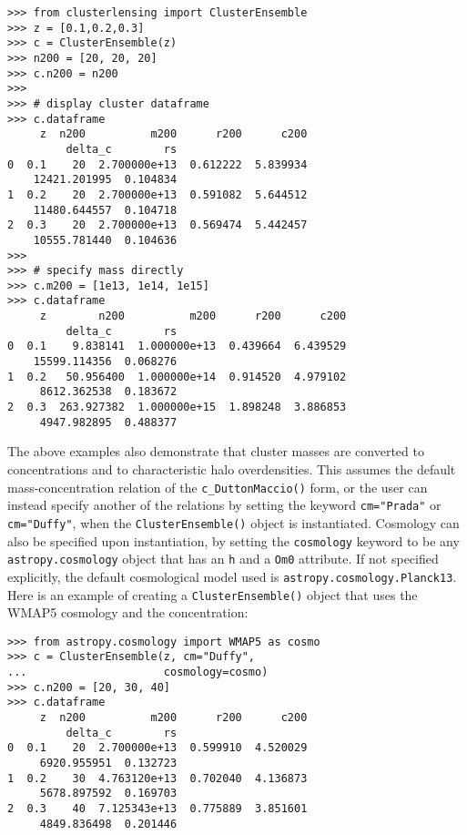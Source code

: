 \documentclass[twocolumn]{aastex6}
\newcommand{\code}{\lstinline[style=codeintext]}
\begin{document}
\begin{verbatim}
>>> from clusterlensing import ClusterEnsemble
>>> z = [0.1,0.2,0.3]
>>> c = ClusterEnsemble(z)
>>> n200 = [20, 20, 20]
>>> c.n200 = n200
>>> 
>>> # display cluster dataframe
>>> c.dataframe
     z  n200          m200      r200      c200
         delta_c        rs
0  0.1    20  2.700000e+13  0.612222  5.839934
    12421.201995  0.104834
1  0.2    20  2.700000e+13  0.591082  5.644512
    11480.644557  0.104718
2  0.3    20  2.700000e+13  0.569474  5.442457
    10555.781440  0.104636
>>> 
>>> # specify mass directly
>>> c.m200 = [1e13, 1e14, 1e15]
>>> c.dataframe
     z        n200          m200      r200      c200
         delta_c        rs
0  0.1    9.838141  1.000000e+13  0.439664  6.439529
    15599.114356  0.068276
1  0.2   50.956400  1.000000e+14  0.914520  4.979102
     8612.362538  0.183672
2  0.3  263.927382  1.000000e+15  1.898248  3.886853
     4947.982895  0.488377
\end{verbatim}

The above examples also demonstrate that cluster masses are converted to concentrations and to characteristic halo overdensities. This assumes the default mass-concentration relation of the \code{c_DuttonMaccio()} form, or the user can instead specify another of the relations by setting the keyword \code{cm="Prada"} or \code{cm="Duffy"}, when the \code{ClusterEnsemble()} object is instantiated. Cosmology can also be specified upon instantiation, by setting the \code{cosmology} keyword to be any \code{astropy.cosmology} object that has an \code{h} and a \code{Om0} attribute. If not specified explicitly, the default cosmological model used is \code{astropy.cosmology.Planck13}. Here is an example of creating a \code{ClusterEnsemble()} object that uses the WMAP5 cosmology \citep{WMAP5} and the \citet{Duffy08} concentration:

\begin{verbatim}
>>> from astropy.cosmology import WMAP5 as cosmo
>>> c = ClusterEnsemble(z, cm="Duffy",
...                     cosmology=cosmo)
>>> c.n200 = [20, 30, 40]
>>> c.dataframe
     z  n200          m200      r200      c200
         delta_c        rs
0  0.1    20  2.700000e+13  0.599910  4.520029
     6920.955951  0.132723
1  0.2    30  4.763120e+13  0.702040  4.136873
     5678.897592  0.169703
2  0.3    40  7.125343e+13  0.775889  3.851601
     4849.836498  0.201446
\end{verbatim}
\end{document}
